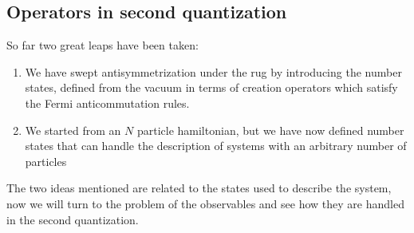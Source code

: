 \documentclass[oneside,11pt]{memoir}
\begin{document}
\subsection{Operators in second quantization}

So far two great leaps have been taken: 
\begin{enumerate}
 \item We have swept antisymmetrization under the rug by introducing the number
states, defined from the vacuum in terms of creation operators which satisfy
the Fermi anticommutation rules. 
 
 \item We started from an $N$ particle hamiltonian, but we have now defined
number states that can handle the description of systems with an arbitrary
number of particles 
\end{enumerate}
The two ideas mentioned are related to the states used to describe the system,
now we will turn to the problem of the observables and see how they are handled
in the second quantization.  
\end{document}

